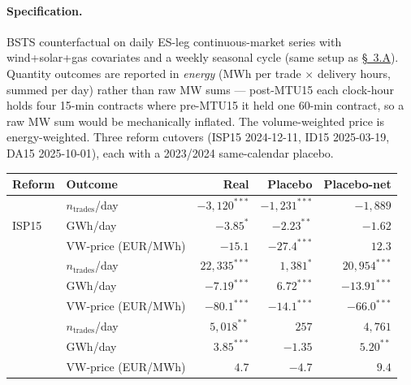\documentclass[11pt]{article}
\begin{document}
\paragraph{Specification.} BSTS counterfactual on daily ES-leg continuous-market series with wind+solar+gas covariates and a weekly seasonal cycle (same setup as \hyperref[sec:bsts]{\S~3.A}). Quantity outcomes are reported in \emph{energy} (MWh per trade $\times$ delivery hours, summed per day) rather than raw MW sums --- post-MTU15 each clock-hour holds four 15-min contracts where pre-MTU15 it held one 60-min contract, so a raw MW sum would be mechanically inflated. The volume-weighted price is energy-weighted. Three reform cutovers (ISP15 2024-12-11, ID15 2025-03-19, DA15 2025-10-01), each with a 2023/2024 same-calendar placebo.

\begin{center}
\footnotesize
\setlength{\tabcolsep}{4pt}
\begin{tabular}{l l r r r}
\toprule
\textbf{Reform} & \textbf{Outcome} & \textbf{Real} & \textbf{Placebo} & \textbf{Placebo-net} \\
\midrule
\multirow{3}{*}{ISP15}  & $n_{\text{trades}}$/day  & $-3{,}120^{***}$ & $-1{,}231^{***}$ & $-1{,}889$ \\
                        & GWh/day                  & $-3.85^{*}$      & $-2.23^{**}$     & $-1.62$ \\
                        & VW-price (EUR/MWh)       & $-15.1$          & $-27.4^{***}$    & $12.3$ \\
\addlinespace
\multirow{3}{*}{ID15}   & $n_{\text{trades}}$/day  & $22{,}335^{***}$ & $1{,}381^{*}$    & $20{,}954^{***}$ \\
                        & GWh/day                  & $-7.19^{***}$    & $6.72^{***}$     & $-13.91^{***}$ \\
                        & VW-price (EUR/MWh)       & $-80.1^{***}$    & $-14.1^{***}$    & $-66.0^{***}$ \\
\addlinespace
\multirow{3}{*}{DA15}   & $n_{\text{trades}}$/day  & $5{,}018^{**}$   & $257$            & $4{,}761$ \\
                        & GWh/day                  & $3.85^{***}$     & $-1.35$          & $5.20^{**}$ \\
                        & VW-price (EUR/MWh)       & $4.7$            & $-4.7$           & $9.4$ \\
\bottomrule
\end{tabular}
\end{center}
\end{document}
